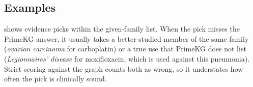 \subsection{Examples}

 shows evidence picks within the given-family list. When the pick misses the PrimeKG answer, it usually takes a better-studied member of the same family (\emph{ovarian carcinoma} for carboplatin) or a true use that PrimeKG does not list (\emph{Legionnaires' disease} for moxifloxacin, which is used against this pneumonia). Strict scoring against the graph counts both as wrong, so it understates how often the pick is clinically sound.


